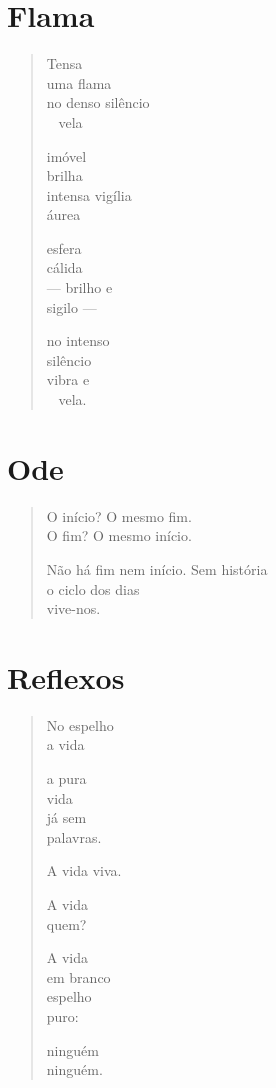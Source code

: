 \chapter{Flama}

\begin{verse}
Tensa\\
uma flama\\
no denso silêncio\\
\qquad\qquad\quad\mbox{ } vela

imóvel\\
brilha\\
intensa vigília\\
\qquad\quad áurea

esfera\\
cálida\\
--- brilho e\\
\quad sigilo ---

no intenso\\
silêncio\\
vibra e\\
\qquad\mbox{ } vela.
\end{verse}

\chapter{Ode}

\begin{verse}
O início? O mesmo fim.\\
O fim? O mesmo início.

Não há fim nem início. Sem história\\
o ciclo dos dias\\
vive-nos.
\end{verse}

\chapter{Reflexos}

\begin{verse}
No espelho\\
a vida

a pura\\
vida\\
já sem\\
palavras.

A vida viva.

A vida\\
quem?

A vida\\
em branco\\
espelho\\
puro:

ninguém\\
ninguém.
\end{verse}

